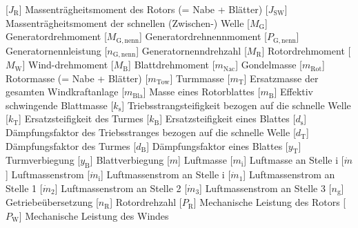 \documentclass[
	pagesize,
	fontsize=12pt,
	paper=a4,
	oneside,
    reqno
]{scrartcl}
\numberwithin{equation}{section} %
\numberwithin{table}{section} %
\numberwithin{figure}{section} %
\begin{document}
\begin{acronym}[Symbols]
           [$J_{\mathrm{R}}$]          {Massenträgheitsmoment des Rotors (= Nabe + Blätter)}
          [$J_{\mathrm{SW}}$]         {Massenträgheitsmoment der schnellen (Zwischen-) Welle}
           [$M_{\mathrm{G}}$]          {Generatordrehmoment}
       [$M_{\mathrm{G,nenn}}$]     {Generatordrehnennmoment}
           [$P_{\mathrm{G,nenn}}$]     {Generatornennleistung}
           [$n_{\mathrm{G,nenn}}$]     {Generatornenndrehzahl}
           [$M_{\mathrm{R}}$]          {Rotordrehmoment}
           [$M_{\mathrm{W}}$]          {\glqq Wind\grqq{}-drehmoment}
           [$M_{\mathrm{B}}$]          {Blattdrehmoment}
         [$m_{\mathrm{Nac}}$]        {Gondelmasse}
         [$m_{\mathrm{Rot}}$]        {Rotormasse (= Nabe + Blätter)}
         [$m_{\mathrm{Tow}}$]        {Turmmasse}
           [$m_{\mathrm{T}}$]          {Ersatzmasse der gesamten Windkraftanlage}
         [$m_{\mathrm{Bla}}$]        {Masse eines Rotorblattes}
           [$m_{\mathrm{B}}$]          {Effektiv schwingende Blattmasse}
           [$k_{\mathrm{s}}$]          {Triebsstrangsteifigkeit bezogen auf die schnelle Welle}
           [$k_{\mathrm{T}}$]          {Ersatzsteifigkeit des Turmes}
           [$k_{\mathrm{B}}$]          {Ersatzsteifigkeit eines Blattes}
           [$d_{\mathrm{s}}$]          {Dämpfungsfaktor des Triebsstranges bezogen auf die schnelle Welle}
           [$d_{\mathrm{T}}$]          {Dämpfungsfaktor des Turmes}
           [$d_{\mathrm{B}}$]          {Dämpfungsfaktor eines Blattes}
           [$y_{\mathrm{T}}$]          {Turmverbiegung}
           [$y_{\mathrm{B}}$]          {Blattverbiegung}
            [$m$]                       {Luftmasse}
           [$m_{\mathrm{i}}$]          {Luftmasse an Stelle i}
         [$\dot m$]                  {Luftmassenstrom}
        [$\dot{m}_{\mathrm{i}}$]    {Luftmassenstrom an Stelle i}
        [$\dot{m}_{\mathrm{1}}$]    {Luftmassenstrom an Stelle 1}
        [$\dot{m}_{\mathrm{2}}$]    {Luftmassenstrom an Stelle 2}
        [$\dot{m}_{\mathrm{3}}$]    {Luftmassenstrom an Stelle 3}
           [$n_{\mathrm{g}}$]          {Getriebeübersetzung}
           [$n_{\mathrm{R}}$]          {Rotordrehzahl}
           [$P_{\mathrm{R}}$]          {Mechanische Leistung des Rotors}
           [$P_{\mathrm{W}}$]          {Mechanische Leistung des Windes}

\end{acronym}
\end{document}
